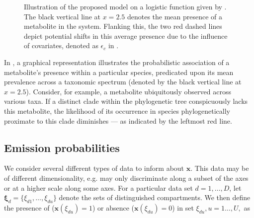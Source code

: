 \documentclass[
11pt, %
oneside, %
english, %
singlespacing, %
headsepline, %
chapterinoneline, %
]{MastersDoctoralThesis} %
\def\x{\boldsymbol{x}}
\def\bxi{\boldsymbol{\xi}}
\begin{document}
\begin{figure}[h]
	\centering
	\caption{Illustration of the proposed model on a logistic function given by . The black vertical line at $x=2.5$ denotes the mean presence of a metabolite in the system. Flanking this, the two red dashed lines depict potential shifts in this average presence due to the influence of covariates, denoted as $\epsilon_c$ in .}
	\label{fig: example sigmoid function}
\end{figure}

In , a graphical representation illustrates the probabilistic association of a metabolite's presence within a particular species, predicated upon its mean prevalence across a taxonomic spectrum (denoted by the black vertical line at $x=2.5$). Consider, for example, a metabolite ubiquitously observed across various taxa. If a distinct clade within the phylogenetic tree conspicuously lacks this metabolite, the likelihood of its occurrence in species phylogenetically proximate to this clade diminishes — as indicated by the leftmost red line.
	
	\subsection{Emission probabilities}\label{subsec:emission probabilities}
	We consider several different types of data to inform about $\x$. This data may be of different dimensionality, e.g. may only discriminate along a subset of the axes or at a higher scale along some axes. For a particular data set $d=1, \ldots, D$, let $\bxi_d=\{\xi_{d1}, \ldots, \xi_{du}\}$ denote the sets of distinguished compartments. We then define the presence of ($\x(\xi_{du})=1$) or absence ($\x(\xi_{du})=0$) in set $\xi_{du}, u=1\ldots,U,$ as
	
\end{document}
